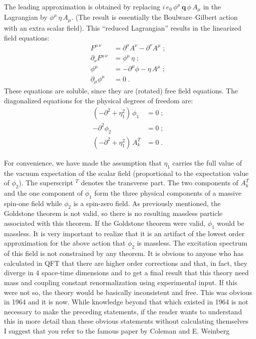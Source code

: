 \documentclass[letterpaper,twoside,preprintnumbers,slac_one]{revtex4}
\begin{document}
The leading approximation is obtained by replacing $i\, e_0\,
\phi^{\mu}\, \mathbf{q}\, \phi\, A_{\mu}$ in the Lagrangian by
$\phi^{\mu}\, \eta\, A_{\mu}$. (The result is essentially the
Boulware--Gilbert action with an extra scalar field). This ``reduced
Lagrangian'' results in the linearized field equations:
\begin{align*}
  F^{\mu\, \nu} &= \partial^{\mu} A^{\nu} - \partial^{\nu} A^{\mu} \; ;\\
  \partial_{\nu} F^{\mu\, \nu} &= \phi^{\mu}\, \eta\; ; \\
  \phi^{\mu} &= -\partial^{\mu}\phi - \eta\, A^{\mu} \; ; \\
  \partial_{\mu}\phi^{\mu} &= 0\; .
\end{align*}
These equations are soluble, since they are (rotated) free field
equations. The diagonalized equations for the physical degrees of freedom
are:
\begin{align*}
  (-\partial^2 + \eta_1^2)\, \phi_1 &= 0 \; ;\\
  -\partial^2 \phi_2 &= 0 \; ;\\
  (-\partial^2 + \eta_1^2)\, A_k^T &= 0 \; .
\end{align*}

For convenience, we have made the assumption that $\eta_1$ carries the
full value of the vacuum expectation of the scalar field (proportional
to the expectation value of $\phi_2$).  The superscript ${}^T$ denotes
the transverse part.  The two components of $A_k^T$ and the one
component of $\phi_1$ form the three physical components of a massive
spin-one field while $\phi_2$ is a spin-zero field. As previously
mentioned, the Goldstone theorem is not valid, so there is no
resulting massless particle associated with this theorem. If the
Goldstone theorem were valid, $\phi_1$ would be massless. It is very
important to realize that it is an artifact of the lowest order
approximation for the above action that $\phi_2$ is massless. The
excitation spectrum of this field is not constrained by any
theorem. It is obvious to anyone who has calculated in QFT that there
are higher order corrections and that, in fact, they diverge in 4
space-time dimensions and to get a final result that this theory need
mass and coupling constant renormalization using experimental
input. If this were not so, the theory would be basically inconsistent
and free. This was obvious in 1964 and it is now. While knowledge
beyond that which existed in 1964 is not necessary to make the
preceding statements, if the reader wants to understand this in more
detail than these obvious statements without calculating themselves I
suggest that you refer to the famous paper by Coleman and E. Weinberg
\cite{cw;1972}
\end{document}
